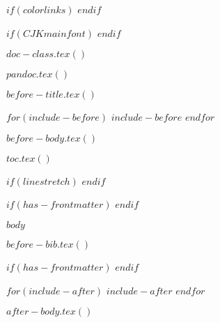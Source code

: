 


$if(colorlinks)$
$endif$

$if(CJKmainfont)$
$endif$

$doc-class.tex()$

\usepackage{iftex}

$pandoc.tex()$

$before-title.tex()$


$for(include-before)$
$include-before$
$endfor$

$before-body.tex()$

$toc.tex()$

$if(linestretch)$
$endif$

$if(has-frontmatter)$
\mainmatter
$endif$

$body$

$before-bib.tex()$

$if(has-frontmatter)$
\backmatter
$endif$

$for(include-after)$
$include-after$
$endfor$

$after-body.tex()$


